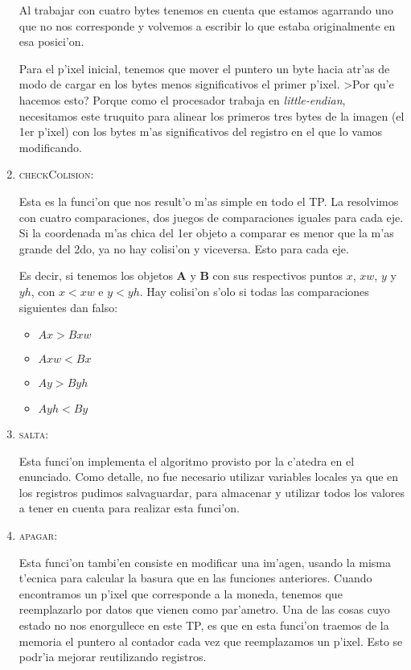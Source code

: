 \begin{enumerate}
Al trabajar con cuatro bytes tenemos en cuenta que estamos agarrando uno que no
nos corresponde y volvemos a escribir lo que estaba originalmente en esa
posici'on.  

Para el p'ixel inicial, tenemos que mover el puntero un byte hacia atr'as de
modo de cargar en los bytes menos significativos el primer p'ixel.  >Por qu'e
hacemos esto?  Porque como el procesador trabaja en \textit{little-endian}, necesitamos
este truquito para alinear los primeros tres bytes de la imagen (el 1er p'ixel)
con los bytes m'as significativos del registro en el que lo vamos modificando.

\item \textsc{checkColision}:

Esta es la funci'on que nos result'o m'as simple en todo el TP.  La resolvimos
con cuatro comparaciones, dos juegos de comparaciones iguales para cada eje.
Si la coordenada m'as chica del 1er objeto a comparar es menor que la m'as
grande del 2do, ya no hay colisi'on y viceversa.  Esto para cada eje.

Es decir, si tenemos los objetos \textbf{A} y \textbf{B} con sus respectivos
puntos $x$, $xw$, $y$ y $yh$, con $x < xw$ e $y < yh$. Hay colisi'on s'olo si
todas las comparaciones siguientes dan falso:
\begin{itemize}
  \item $Ax > Bxw$
  \item $Axw < Bx$
  \item $Ay > Byh$
  \item $Ayh < By$
\end{itemize}

\item \textsc{salta}:

Esta funci'on implementa el algoritmo provisto por la c'atedra en el enunciado.
Como detalle, no fue necesario utilizar variables locales ya que en los
registros pudimos salvaguardar, para almacenar y utilizar todos los valores a
tener en cuenta para realizar esta funci'on.

\pagebreak
\item \textsc{apagar}:

Esta funci'on tambi'en consiste en modificar una im'agen, usando la misma
t'ecnica para calcular la basura que en las funciones anteriores.  Cuando
encontramos un p'ixel que corresponde a la moneda, tenemos que reemplazarlo por
datos que vienen como par'ametro.  Una de las cosas cuyo estado no nos
enorgullece en este TP, es que en esta funci'on traemos de la memoria el
puntero al contador cada vez que reemplazamos un p'ixel.  Esto se podr'ia
mejorar reutilizando registros.
\end{enumerate}



